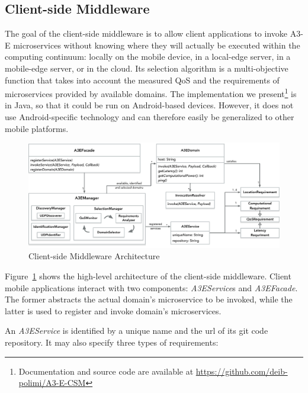 \subsection{Client-side Middleware}


The goal of the client-side middleware is to allow client applications to invoke A3-E microservices without knowing where they will actually be executed within the computing continuum: locally on the mobile device, in a local-edge server, in a mobile-edge server, or in the cloud. 
Its selection algorithm is a multi-objective function that takes into account the measured QoS and the requirements of microservices provided by available domains.
The implementation we present\footnote{Documentation and source code are available at \url{https://github.com/deib-polimi/A3-E-CSM}} is in Java, so that it could be run on Android-based devices. However, it does not use Android-specific technology and can therefore easily be generalized to other mobile platforms. 

\begin{figure}[tbp]
	\includegraphics[width=1\textwidth]{figs/a3e-mobile-prototype}
	\caption{Client-side Middleware Architecture}
	\label{fig:mobile-prototype}
\end{figure}

Figure~\ref{fig:mobile-prototype} shows the high-level architecture of the client-side middleware. Client mobile applications interact with two components: \textit{A3EService}s and \textit{A3EFacade}. The former abstracts the actual domain's microservice to be invoked, while the latter is used to register and invoke domain's microservices. 

An \textit{A3EService} is identified by a unique name and the url of its git code repository. It may also specify three types of requirements: 

